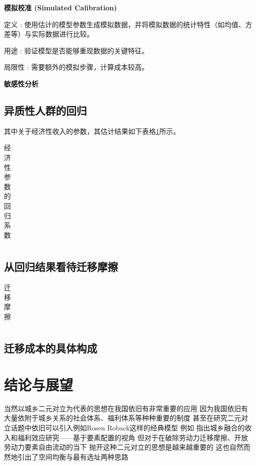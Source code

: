 \documentclass[a4paper, zihao=-4, fontset = mac, oneside]{ctexbook} %
\begin{document}
\textbf{模拟校准 (Simulated Calibration)}

定义 : 使用估计的模型参数生成模拟数据，并将模拟数据的统计特性（如均值、方差等）与实际数据进行比较。

用途 : 验证模型是否能够重现数据的关键特征。

局限性 : 需要额外的模拟步骤，计算成本较高。

\textbf{敏感性分析}


\section{异质性人群的回归} 

其中关于经济性收入的参数，其估计结果如下表格\ref{tab:经济性参数的回归系数}所示。
\begin{table}[!ht]
\centering
\caption{经济性参数的回归系数}
\begin{tabularx}{\textwidth}{@{}cXXX@{}}
\toprule
\midrule
\bottomrule
\end{tabularx}
\label{tab:经济性参数的回归系数}
\end{table}


\section{从回归结果看待迁移摩擦}


\begin{table}[!ht]
\centering
\caption{迁移摩擦}
\begin{tabularx}{\textwidth}{@{}cXXX@{}}
\toprule
\midrule
\bottomrule
\end{tabularx}
\label{tab:迁移摩擦}
\end{table}



\section{迁移成本的具体构成}






\chapter{结论与展望}

当然以城乡二元对立为代表的思想在我国依旧有非常重要的应用 因为我国依旧有大量依附于城乡关系的社会体系、福利体系等种种重要的制度
甚至在研究二元对立话题中依旧可以引入例如Rosen Roback这样的经典模型
例如 
\textcite{GuoDongMeiChengXiangRongHeDeShouRuHeFuLiXiaoYingYanJiuJiYuYaoSuPeiZhiDeShiJiao2023}指出城乡融合的收入和福利效应研究——基于要素配置的视角
但对于在破除劳动力迁移摩擦、开放劳动力要素自由流动的当下
抛开这种二元对立的思想是越来越重要的
这也自然而然地引出了空间均衡与最有选址两种思路
\end{document}
